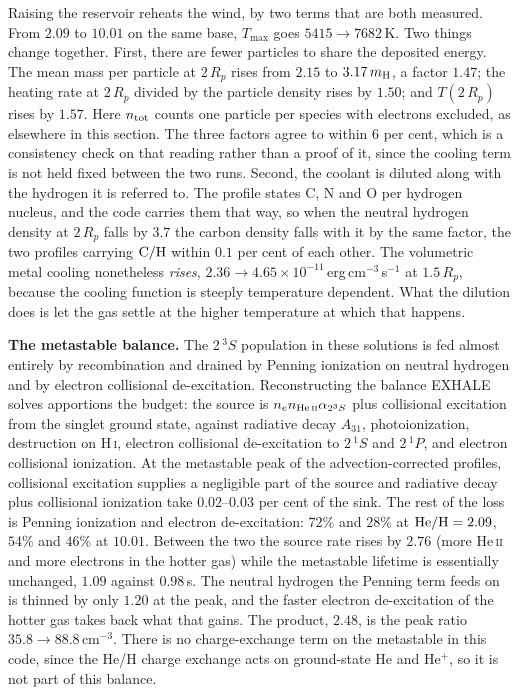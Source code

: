\documentclass[english,a4paper]{my_memo}
\begin{document}
\medskip
\noindent Raising the reservoir reheats the wind, by two terms that are both
measured. From $2.09$ to $10.01$ on the same base, $T_{\max}$ goes
$5415 \rightarrow 7682$\,K. Two things change together. First, there are
fewer particles to share the deposited energy. The mean mass per particle at
$2\,R_p$ rises from $2.15$ to $3.17\,m_{\rm H}$, a factor $1.47$; the heating
rate at $2\,R_p$ divided by the particle density rises by $1.50$; and
$T(2\,R_p)$ rises by $1.57$. Here $n_{\rm tot}$ counts one particle per
species with electrons excluded, as elsewhere in this section. The three
factors agree to within $6$ per cent, which is a consistency check on that
reading rather than a proof of it, since the cooling term is not held fixed
between the two runs. Second, the coolant is diluted along with the hydrogen
it is referred to. The profile states C, N and O per hydrogen nucleus, and
the code carries them that way, so when the neutral hydrogen density at
$2\,R_p$ falls by $3.7$ the carbon density falls with it by the same factor,
the two profiles carrying ${\rm C/H}$ within $0.1$ per cent of each other.
The volumetric metal cooling nonetheless \emph{rises},
$2.36 \rightarrow 4.65\times10^{-11}$\,erg\,cm$^{-3}$\,s$^{-1}$ at
$1.5\,R_p$, because the cooling function is steeply temperature dependent.
What the dilution does is let the gas settle at the higher temperature at
which that happens.

\medskip
\noindent\textbf{The metastable balance.} The 2\,$^3S$ population in these
solutions is fed almost entirely by recombination and drained by Penning
ionization on neutral hydrogen and by electron collisional de-excitation.
Reconstructing the balance EXHALE solves apportions the budget: the source is
$n_e n_{\rm He\,\textsc{ii}}\alpha_{2^3S}$ plus collisional excitation from
the singlet ground state, against radiative decay $A_{31}$,
photoionization, destruction on H\,\textsc{i}, electron collisional
de-excitation to $2\,^1S$ and $2\,^1P$, and electron collisional ionization.
At the metastable peak of the advection-corrected profiles, collisional
excitation supplies a negligible part of the source and radiative decay plus
collisional ionization take $0.02$--$0.03$ per cent of the sink. The rest of
the loss is Penning ionization and electron de-excitation: $72\%$ and $28\%$
at ${\rm He/H} = 2.09$, $54\%$ and $46\%$ at $10.01$. Between the two the
source rate rises by $2.76$ (more He\,\textsc{ii} and more electrons in the
hotter gas) while the metastable lifetime is essentially unchanged, $1.09$
against $0.98$\,s. The neutral hydrogen the Penning term feeds on is thinned
by only $1.20$ at the peak, and the faster electron de-excitation of the
hotter gas takes back what that gains. The product, $2.48$, is the peak ratio
$35.8 \rightarrow 88.8$\,cm$^{-3}$. There is no charge-exchange term on the
metastable in this code, since the He/H charge exchange acts on ground-state
He and He$^+$, so it is not part of this balance.
\end{document}
